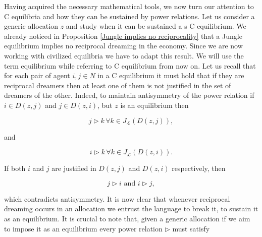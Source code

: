 




Having acquired the necessary mathematical tools, we now turn our attention to C equilibria and how they can be sustained by power relations. Let us consider a generic allocation $z$ and study when it can be sustained a s C equilibrium. We already noticed in Proposition \ref{Jungle implies no reciprocality} that a Jungle equilibrium implies no reciprocal dreaming in the economy. Since we are now working with civilized equilibria we have to adapt this result. We will use the term equilibrium while referring to C equilibrium from now on. Let us recall that for each pair of agent $i,j\in N$ in a C equilibrium it must hold that if they are reciprocal dreamers then at least one of them is not justified in the set of dreamers of the other. Indeed, to maintain antisymmetry of the power relation if $i\in D(z,j)$ and $j\in D(z,i)$, but $z$ is an equilibrium then

\[j\triangleright k\,\forall k\in J_{\mathcal{L}}(D(z,j)),\]

and 

\[i\triangleright k\,\forall k\in J_{\mathcal{L}}(D(z,i)).\]

If both $i$ and $j$ are justified in $D(z,j)$ and $D(z,i)$ respectively, then

\[j\triangleright i \text{ and } i\triangleright j,\]

which contradicts antisymmetry. It is now clear that whenever reciprocal dreaming occurs in an allocation we entrust the language to break it, to sustain it as an equilibrium. It is crucial to note that, given a generic allocation if we aim to impose it as an equilibrium every power relation $\triangleright$ must satisfy

